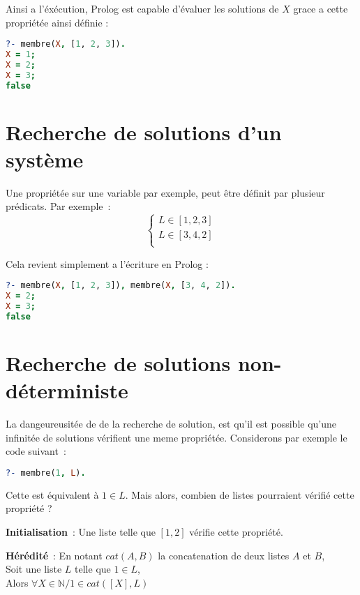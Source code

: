 Ainsi a l'éxécution, Prolog est capable d'évaluer les solutions de $X$ grace a
cette propriétée ainsi définie :

\begin{lstlisting}[language=Prolog,frame=single]
?- membre(X, [1, 2, 3]).
X = 1;
X = 2;
X = 3;
false
\end{lstlisting}


\section{Recherche de solutions d'un système}

Une propriétée sur une variable par exemple, peut être définit par plusieur
prédicats. Par exemple~:
\[
    \left\{  
    \begin{array}{c}
        L \in [1, 2, 3]\\
        L \in [3, 4, 2]\\
    \end{array}
    \right .
\]

Cela revient simplement a l'écriture en Prolog :
\begin{lstlisting}[language=Prolog,frame=single]
?- membre(X, [1, 2, 3]), membre(X, [3, 4, 2]).
X = 2;
X = 3;
false
\end{lstlisting}


\section{Recherche de solutions non-déterministe}

La dangeureusitée de de la recherche de solution, est qu'il est possible qu'une
infinitée de solutions vérifient une meme propriétée. Considerons par exemple
le code suivant~:

\begin{lstlisting}[language=Prolog,frame=single]
?- membre(1, L).
\end{lstlisting}

Cette est équivalent à $1 \in L$. Mais alors, combien de listes
pourraient vérifié cette propriété ?

\textbf{Initialisation}~: Une liste telle que $[1, 2]$ vérifie cette propriété.

\textbf{Hérédité}~: En notant $cat(A, B)$ la concatenation de deux listes $A$ et
$B$,\\
Soit une liste $L$ telle que $1 \in L$,\\
Alors $\forall X \in \mathbb{N} / 1 \in cat([X], L)$

